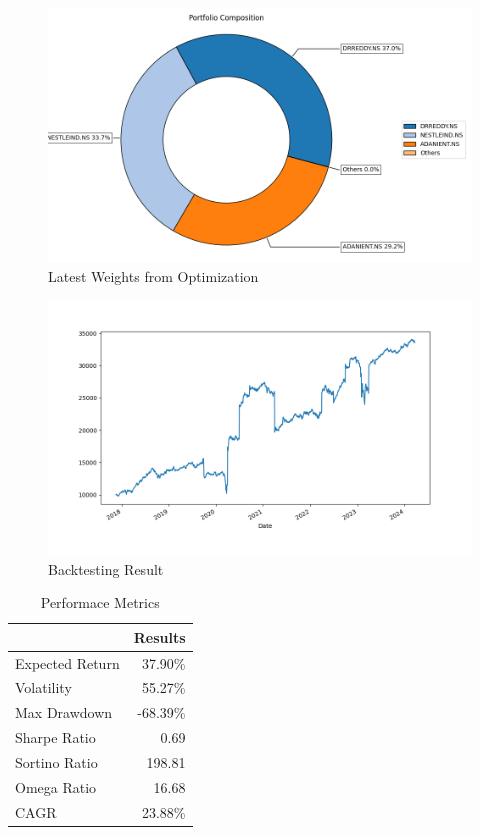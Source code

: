 \begin{figure}[H]
   \centering
   \includegraphics[width=1\linewidth]{images/minimax/Weights.png}
   \caption{Latest Weights from Optimization}
   \label{fig:network_architecture1}
 \end{figure}

 \begin{figure}[H]
   \centering
   \includegraphics[width=1\linewidth]{images/minimax/backtest.png}
   \caption{Backtesting Result}
   \label{fig:network_architecture1}
 \end{figure}

 \begin{table}[H]

    \centering %
    \label{tab:performance_metrics}
    
    \caption{Performace Metrics}
    \vspace{5mm} %

\begin{tabular}{lr}
\toprule
 & Results \\
\midrule
Expected Return & 37.90\% \\
Volatility & 55.27\% \\
Max Drawdown & -68.39\% \\
Sharpe Ratio & 0.69 \\
Sortino Ratio & 198.81 \\
Omega Ratio & 16.68 \\
CAGR & 23.88\% \\
\bottomrule
\end{tabular}
\end{table}

